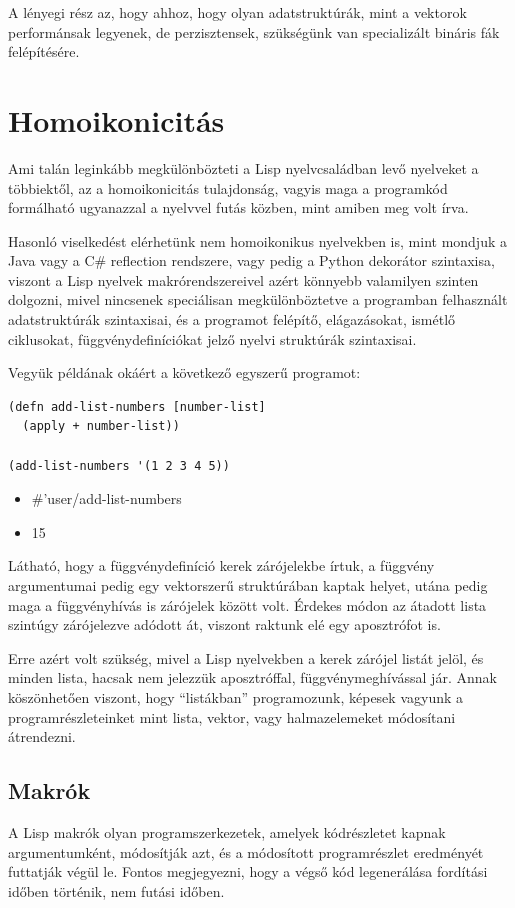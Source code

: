 \documentclass[final, 12pt] {ubb_dolgozat}{book}
\begin{document}
A lényegi rész az, hogy ahhoz, hogy olyan adatstruktúrák, mint a vektorok performánsak legyenek, de perzisztensek, szükségünk van
specializált bináris fák felépítésére.

\section{Homoikonicitás}
\label{sec:orgd9be8a4}
Ami talán leginkább megkülönbözteti a Lisp nyelvcsaládban levő nyelveket a többiektől, az a  homoikonicitás \citep{mcilroyMacroInstructionExtensions1960} tulajdonság, vagyis maga a programkód
formálható ugyanazzal a nyelvvel futás közben, mint amiben meg volt írva.

Hasonló viselkedést elérhetünk nem homoikonikus nyelvekben is, mint mondjuk a Java vagy a C\# reflection rendszere, vagy
pedig a Python dekorátor szintaxisa, viszont a Lisp nyelvek makrórendszereivel azért könnyebb valamilyen szinten dolgozni, mivel nincsenek speciálisan megkülönböztetve a programban
felhasznált adatstruktúrák szintaxisai, és a programot felépítő, elágazásokat, ismétlő ciklusokat, függvénydefiníciókat jelző nyelvi struktúrák szintaxisai.

Vegyük példának okáért a következő egyszerű programot:

\begin{verbatim}
(defn add-list-numbers [number-list]
  (apply + number-list))

(add-list-numbers '(1 2 3 4 5))
\end{verbatim}

\begin{itemize}
\item \#'user/add-list-numbers
\item 15
\end{itemize}

Látható, hogy a függvénydefiníció kerek zárójelekbe írtuk, a függvény argumentumai pedig egy vektorszerű struktúrában kaptak helyet, utána pedig maga a függvényhívás is zárójelek között volt. Érdekes módon az átadott lista szintúgy zárójelezve adódott át, viszont raktunk elé egy aposztrófot is.

Erre azért volt szükség, mivel a Lisp nyelvekben a kerek zárójel listát jelöl, és minden lista, hacsak nem jelezzük aposztróffal, függvénymeghívással jár. Annak köszönhetően viszont, hogy ``listákban'' programozunk, képesek vagyunk a programrészleteinket mint lista, vektor, vagy halmazelemeket
módosítani átrendezni.

\subsection{Makrók}
\label{sec:orgbbb13fd}
A Lisp makrók olyan programszerkezetek, amelyek kódrészletet kapnak argumentumként, módosítják azt, és a módosított programrészlet eredményét futtatják végül le. Fontos megjegyezni, hogy a végső kód legenerálása fordítási időben történik, nem futási időben.
\end{document}
